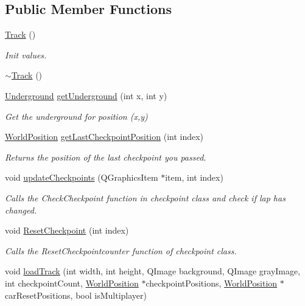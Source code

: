 \subsection*{Public Member Functions}
\begin{DoxyCompactItemize}
\item 
\mbox{\hyperlink{class_track_a11457bcda8be04595018c11173d8241c}{Track}} ()
\begin{DoxyCompactList}\small\item\em Init values. \end{DoxyCompactList}\item 
\mbox{\hyperlink{class_track_a416e75e66accc8eb9e3fafc3e8555216}{$\sim$\+Track}} ()
\item 
\mbox{\hyperlink{track_8h_ac1404ca5b1e2d42556980919aff64ccc}{Underground}} \mbox{\hyperlink{class_track_a461d8e6729dab9eb3bd2c48cd5c19d5d}{get\+Underground}} (int x, int y)
\begin{DoxyCompactList}\small\item\em Get the underground for position (x,y) \end{DoxyCompactList}\item 
\mbox{\hyperlink{class_world_position}{World\+Position}} \mbox{\hyperlink{class_track_afab8a8f2ca23861eac3e59c6fddc6647}{get\+Last\+Checkpoint\+Position}} (int index)
\begin{DoxyCompactList}\small\item\em Returns the position of the last checkpoint you passed. \end{DoxyCompactList}\item 
void \mbox{\hyperlink{class_track_afc8312f0254b11da8ec7c379d8aad898}{update\+Checkpoints}} (Q\+Graphics\+Item $\ast$item, int index)
\begin{DoxyCompactList}\small\item\em Calls the Check\+Checkpoint function in checkpoint class and check if lap has changed. \end{DoxyCompactList}\item 
void \mbox{\hyperlink{class_track_a584de36cdced22b2b06ed0e816dcab09}{Reset\+Checkpoint}} (int index)
\begin{DoxyCompactList}\small\item\em Calls the Reset\+Checkpointcounter function of checkpoint class. \end{DoxyCompactList}\item 
void \mbox{\hyperlink{class_track_a2e3f26b19389218a3119c31a40265b6a}{load\+Track}} (int width, int height, Q\+Image background, Q\+Image gray\+Image, int checkpoint\+Count, \mbox{\hyperlink{class_world_position}{World\+Position}} $\ast$checkpoint\+Positions, \mbox{\hyperlink{class_world_position}{World\+Position}} $\ast$car\+Reset\+Positions, bool is\+Multiplayer)

\end{DoxyCompactItemize}
